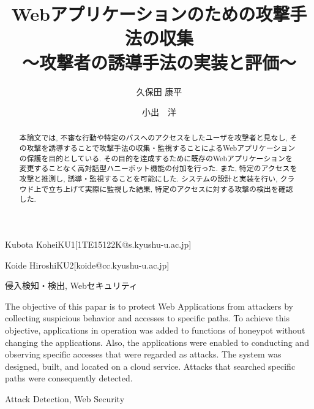 \documentclass[submit,techrep,noauthor]{ipsj}
\begin{document}
\title{Webアプリケーションのための攻撃手法の収集\\
〜攻撃者の誘導手法の実装と評価〜 }





\author{久保田 康平}{Kubota Kohei}{KU1}[1TE15122K@s.kyushu-u.ac.jp]
\author{小出　洋}{Koide Hiroshi}{KU2}[koide@cc.kyushu-u.ac.jp]

\begin{abstract}
本論文では, 不審な行動や特定のパスへのアクセスをしたユーザを攻撃者と見なし,
その攻撃を誘導することで攻撃手法の収集・監視することによるWebアプリケーションの保護を目的としている.
その目的を達成するために既存のWebアプリケーションを変更することなく高対話型ハニーポット機能の付加を行った.
また, 特定のアクセスを攻撃と推測し, 誘導・監視することを可能にした.
システムの設計と実装を行い, クラウド上で立ち上げて実際に監視した結果, 特定のアクセスに対する攻撃の検出を確認した.
\end{abstract}


%
\begin{jkeyword}
侵入検知・検出, Webセキュリティ
\end{jkeyword}

\begin{eabstract}
The objective of this papar is to protect Web Applications from attackers by collecting suspicious behavior and accesses to specific paths.
To achieve this objective, applications in operation was added to functions of honeypot without changing the applications.
Also, the applications were enabled to conducting and observing specific accesses that were regarded as attacks.
The system was designed, built, and located on a cloud service. Attacks that searched specific paths were consequently detected.
\end{eabstract}
%
\begin{ekeyword}
Attack Detection, Web Security
\end{ekeyword}

\maketitle
\end{document}
